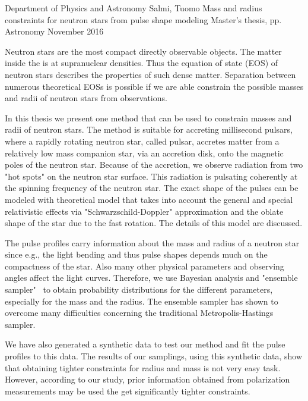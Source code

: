 \documentclass{wihuri}
\begin{document}
\begin{tiivistelma}%
        {Department of Physics and Astronomy}%
        {Salmi, Tuomo}%
        {Mass and radius constraints for neutron stars
from pulse shape modeling}
        {Master's thesis, \pageref{LastPage} pp.}%
        {Astronomy}%
        {November 2016}%

	Neutron stars are the most compact directly observable objects. The matter inside the is at supranuclear densities. Thus the equation of state (EOS) of neutron stars describes the properties of such dense matter. Separation between numerous theoretical EOSs is possible if we are able constrain the possible masses and radii of neutron stars from observations.
	
In this thesis we present one method that can be used to constrain masses and radii of neutron stars. The method is suitable for accreting millisecond pulsars, where a rapidly rotating neutron star, called pulsar, accretes matter from a relatively low mass companion star, via an accretion disk, onto the magnetic poles of the neutron star. Because of the accretion, we observe radiation from two "hot spots" on the neutron star surface. This radiation is pulsating coherently at the spinning frequency of the neutron star. The exact shape of the pulses can be modeled with  theoretical model that takes into account the general and special relativistic effects via "Schwarzschild-Doppler" approximation and the oblate shape of the star due to the fast rotation. The details of this model are discussed. 
	
The pulse profiles carry information about the mass and radius of a neutron star since e.g., the light bending and thus pulse shapes depends much on the compactness of the star. Also many other physical parameters and observing angles affect the light curves. Therefore, we use Bayesian analysis and "ensemble sampler" \ to obtain probability distributions for the different parameters, especially for the mass and the radius. The ensemble sampler has shown to overcome many difficulties concerning the traditional Metropolis-Hastings sampler. 

We have also generated a synthetic data to test our method and fit the pulse profiles to this data. The results of our samplings, using this synthetic data, show that obtaining tighter constraints for radius and mass is not very easy task. However, according to our study, prior information obtained from polarization measurements may be used the get significantly tighter constraints.  

	
	
\end{tiivistelma}
\end{document}
